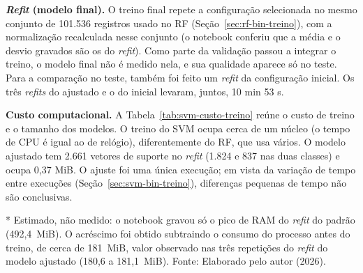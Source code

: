 \documentclass[
    12pt,                %
    openright,           %
    oneside,             %
    a4paper,             %
    english,             %
    brazil               %
]{abntex2}
\begin{document}
\textbf{\textit{Refit} (modelo final).} O treino final repete a configuração selecionada no mesmo conjunto de 101.536 registros usado no RF (Seção~\ref{sec:rf-bin-treino}), com a normalização recalculada nesse conjunto (o notebook conferiu que a média e o desvio gravados são os do \textit{refit}). Como parte da validação passou a integrar o treino, o modelo final não é medido nela, e sua qualidade aparece só no teste. Para a comparação no teste, também foi feito um \textit{refit} da configuração inicial. Os três \textit{refits} do ajustado e o do inicial levaram, juntos, 10 min 53 s.

\textbf{Custo computacional.} A Tabela~\ref{tab:svm-custo-treino} reúne o custo de treino e o tamanho dos modelos. O treino do SVM ocupa cerca de um núcleo (o tempo de CPU é igual ao de relógio), diferentemente do RF, que usa vários. O modelo ajustado tem 2.661 vetores de suporte no \textit{refit} (1.824 e 837 nas duas classes) e ocupa 0,37 MiB. O ajuste foi uma única execução; em vista da variação de tempo entre execuções (Seção~\ref{sec:svm-bin-treino}), diferenças pequenas de tempo não são conclusivas.

\begin{table}
\centering
\caption{Custo de treino e tamanho dos modelos SVM (sem os picos de memória do processo)}
\label{tab:svm-custo-treino}
\par\smallskip
* Estimado, não medido: o notebook gravou só o pico de RAM do \textit{refit} do padrão (492,4~MiB). O acréscimo foi obtido subtraindo o consumo do processo antes do treino, de cerca de 181~MiB, valor observado nas três repetições do \textit{refit} do modelo ajustado (180,6 a 181,1~MiB). Fonte: Elaborado pelo autor (2026).
\end{table}
\end{document}
